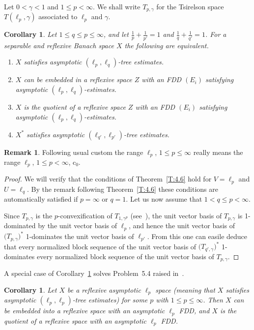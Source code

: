 \documentclass[11pt,leqno]{amsart}
\newtheorem{cor}[thm]{Corollary}
\theoremstyle{definition}
\newtheorem*{remark}{Remark}
\newcommand{\co}{\mathrm{c}_0}
\begin{document}
Let $0<\gamma<1$ and $1\leq p<\infty$. We shall write $T_{p,\gamma}$
for the Tsirelson space $T(\ell_p,\gamma)$ associated to $\ell_p$ and
$\gamma$.
\begin{cor}\label{C:4.7}
  Let $1\le q\le p \le\infty$, and let $\frac1p+\frac1{p'}=1$ and
  $\frac1q+\frac1{q'}=1$. For a separable and reflexive Banach space
  $X$ the following are equivalent.
  \begin{enumerate}
  \item[a)]
    $X$ satisfies asymptotic $(\ell_p,\ell_q)$-tree estimates.
  \item[b)]
    $X$ can be embedded in a reflexive space $Z$ with an FDD $(E_i)$
    satisfying asymptotic $(\ell_p,\ell_q)$-estimates.
  \item[c)]
    $X$  is the quotient of a reflexive space $Z$ with an FDD $(E_i)$
    satisfying asymptotic  $(\ell_p,\ell_q)$-estimates.
  \item[d)]
    $X^*$ satisfies asymptotic $(\ell_{q'},\ell_{p'})$-tree
    estimates.
  \end{enumerate}
\end{cor}
\begin{remark}
  Following usual custom the range $\ell_p$, $1\leq p\leq\infty$
  really means the range $\ell_p$, $1\leq p<\infty$, $\co$.
\end{remark}
\begin{proof}
We will verify that the conditions of Theorem~\ref{T:4.6} hold for
$V=\ell_p$ and $U=\ell_q$. By the remark following Theorem~\ref{T:4.6}
these conditions are automatically satisfied if $p=\infty$ or
$q=1$. Let us now assume that $1<q\leq p<\infty$.

Since $T_{p,\gamma}$ is the $p$-convexification of $T_{1,\gamma^p}$
(see~\cite{CS}), the unit vector basis of $T_{p,\gamma}$ is
1-dominated by the unit vector basis of $\ell_p$, and hence the unit
vector basis of $\big(T_{p,\gamma}\big)^*$ 1-dominates the unit vector
basis of $\ell_{p'}$. From this one can easile deduce that every
normalized block sequence of the unit vector basis of
$\big(T_{q',\gamma}\big)^*$ 1-dominates every normalized block
sequence of the unit vector basis of $T_{p,\gamma}$.
\end{proof}

A special case of Corollary~\ref{C:4.7} solves Problem~5.4 raised
in~\cite{OS1}.
\begin{cor}\label{C:4.6}
  Let $X$ be a reflexive asymptotic $\ell_p$ space (meaning that $X$
  satisfies asymptotic $(\ell_p,\ell_p)$-tree estimates) for some $p$
  with $1\leq p\leq\infty$. Then $X$ can be embedded into a reflexive
  space with an asymptotic $\ell_p$ FDD, and $X$ is the quotient of a
  reflexive space with an asymptotic $\ell_p$ FDD.
\end{cor}
\end{document}
